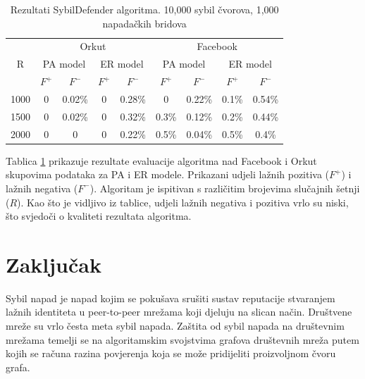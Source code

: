 \documentclass[times, utf8, seminar, numeric]{fer}
\begin{document}
\begin{table}[!h]
	\centering
	\caption{Rezultati SybilDefender algoritma. 10,000 sybil čvorova, 1,000 napadačkih bridova}
	\label{tbl:results}
	
	\begin{tabular}{|c|c|c|c|c|c|c|c|c|} \hline
    \multirow{3}{*}{R} & \multicolumn{4}{c|}{Orkut} & \multicolumn{4}{c|}{Facebook} \\
    & \multicolumn{2}{c}{PA model} & \multicolumn{2}{c|}{ER model} & \multicolumn{2}{c}{PA model} & \multicolumn{2}{c|}{ER model} \\
    & \multicolumn{1}{c}{$F^+$} & \multicolumn{1}{c}{$F^-$} & \multicolumn{1}{c}{$F^+$} & \multicolumn{1}{c|}{$F^-$} & \multicolumn{1}{c}{$F^+$} & \multicolumn{1}{c}{$F^-$} & \multicolumn{1}{c}{$F^+$} & \multicolumn{1}{c|}{$F^-$} \\ \hline
    1000 & 0 & 0.02\% & 0 & 0.28\% & 0 & 0.22\% & 0.1\% & 0.54\% \\
    1500 & 0 & 0.02\% & 0 & 0.32\% & 0.3\% & 0.12\% & 0.2\% & 0.44\% \\
    2000 & 0 & 0 & 0 & 0.22\% & 0.5\% & 0.04\% & 0.5\% & 0.4\% \\
		\hline
	\end{tabular}
\end{table}

Tablica \ref{tbl:results} prikazuje rezultate evaluacije algoritma nad Facebook i Orkut skupovima podataka za PA i ER modele. Prikazani udjeli lažnih pozitiva ($F^+$) i lažnih negativa ($F^-$). Algoritam je ispitivan s različitim brojevima slučajnih šetnji ($R$). Kao što je vidljivo iz tablice, udjeli lažnih negativa i pozitiva vrlo su niski, što svjedoči o kvaliteti rezultata algoritma.

\chapter{Zaključak}




\begin{sazetak}
  Sybil napad je napad kojim se pokušava srušiti sustav reputacije stvaranjem lažnih identiteta u peer-to-peer mrežama koji djeluju na slican način. Društvene mreže su vrlo česta meta sybil napada. Zaštita od sybil napada na društevnim mrežama temelji se na algoritamskim svojstvima grafova društevnih mreža putem kojih se računa razina povjerenja koja se može pridijeliti proizvoljnom čvoru grafa.

\end{sazetak}
\end{document}
